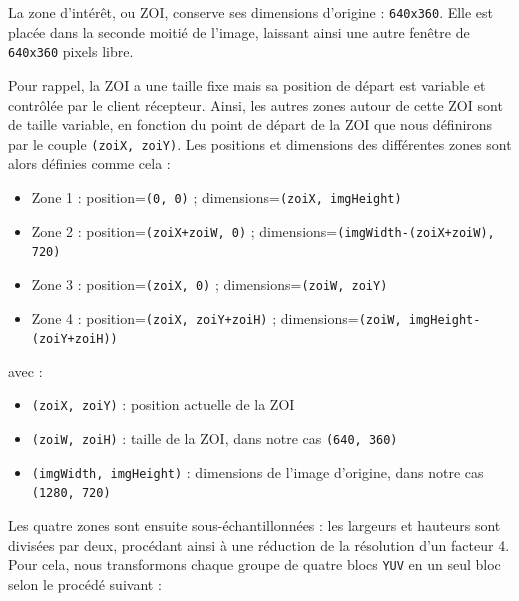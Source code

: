 \documentclass[11pt,a4paper]{article}
\begin{document}
\bigbreak
La zone d'intérêt, ou ZOI, conserve ses dimensions d'origine : \texttt{640x360}.
Elle est placée dans la seconde moitié de l'image, laissant ainsi une autre fenêtre de \texttt{640x360} pixels libre.

\bigbreak
Pour rappel, la ZOI a une taille fixe mais sa position de départ est variable et contrôlée par le client récepteur.
Ainsi, les autres zones autour de cette ZOI sont de taille variable, en fonction du point de départ de la ZOI que nous définirons par le couple \texttt{(zoiX, zoiY)}.
Les positions et dimensions des différentes zones sont alors définies comme cela :
\bigbreak
\begin{itemize}
\item{Zone 1 : position=\texttt{(0, 0)} ; dimensions=\texttt{(zoiX, imgHeight)}}
\item{Zone 2 : position=\texttt{(zoiX+zoiW, 0)} ; dimensions=\texttt{(imgWidth-(zoiX+zoiW), 720)}}
\item{Zone 3 : position=\texttt{(zoiX, 0)} ; dimensions=\texttt{(zoiW, zoiY)}}
\item{Zone 4 : position=\texttt{(zoiX, zoiY+zoiH)} ; dimensions=\texttt{(zoiW, imgHeight-(zoiY+zoiH))}}
\end{itemize}

\bigbreak
avec :
\begin{itemize}
\item{\texttt{(zoiX, zoiY)} : position actuelle de la ZOI}
\item{\texttt{(zoiW, zoiH)} : taille de la ZOI, dans notre cas \texttt{(640, 360)}}
\item{\texttt{(imgWidth, imgHeight)} : dimensions de l'image d'origine, dans notre cas \texttt{(1280, 720)}}
\end{itemize}

\bigbreak
Les quatre zones sont ensuite sous-échantillonnées : les largeurs et hauteurs sont divisées par deux, procédant ainsi à une réduction de la résolution d'un facteur 4.
Pour cela, nous transformons chaque groupe de quatre blocs \texttt{YUV} en un seul bloc selon le procédé suivant :
\end{document}
